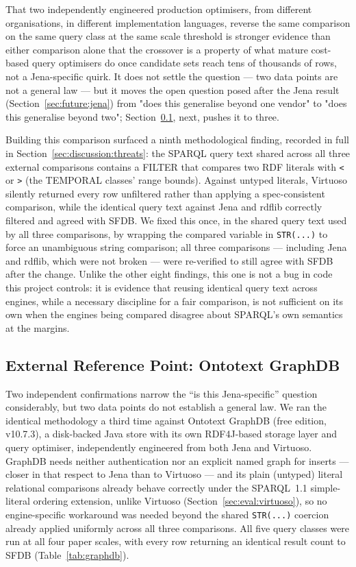 That two independently engineered production optimisers, from different
organisations, in different implementation languages, reverse the same
comparison on the same query class at the same scale threshold is
stronger evidence than either comparison alone that the crossover is a
property of what mature cost-based query optimisers do once candidate
sets reach tens of thousands of rows, not a Jena-specific quirk. It does
not settle the question --- two data points are not a general law --- but it moves the
open question posed after the Jena result (Section~\ref{sec:future:jena})
from "does this generalise beyond one vendor" to "does this generalise
beyond two"; Section~\ref{sec:eval:graphdb}, next, pushes it to three.

Building this comparison surfaced a ninth methodological finding,
recorded in full in Section~\ref{sec:discussion:threats}: the SPARQL
query text shared across all three external comparisons contains a
FILTER that compares two RDF literals with \texttt{<} or \texttt{>}
(the TEMPORAL classes' range bounds). Against untyped literals, Virtuoso
silently returned every row unfiltered rather than applying a
spec-consistent comparison, while the identical query text against Jena
and rdflib correctly filtered and agreed with SFDB. We fixed this once,
in the shared query text used by all three comparisons, by wrapping the
compared variable in \texttt{STR(...)} to force an unambiguous string
comparison; all three comparisons --- including Jena and rdflib, which
were not broken --- were re-verified to still agree with SFDB after the
change. Unlike the other eight findings, this one is not a bug in code
this project controls: it is evidence that reusing identical query text
across engines, while a necessary discipline for a fair comparison, is
not sufficient on its own when the engines being compared disagree about
SPARQL's own semantics at the margins.

\subsection{External Reference Point: Ontotext GraphDB}
\label{sec:eval:graphdb}

Two independent confirmations narrow the ``is this Jena-specific''
question considerably, but two data points do not establish a general
law. We ran the identical methodology a third time against Ontotext
GraphDB (free edition, v10.7.3), a disk-backed Java store with its own
RDF4J-based storage layer and query optimiser, independently engineered
from both Jena and Virtuoso. GraphDB needs neither authentication nor an
explicit named graph for inserts --- closer in that respect to Jena than
to Virtuoso --- and its plain (untyped) literal relational comparisons
already behave correctly under the SPARQL~1.1 simple-literal ordering
extension, unlike Virtuoso (Section~\ref{sec:eval:virtuoso}), so no
engine-specific workaround was needed beyond the shared
\texttt{STR(...)} coercion already applied uniformly across all three
comparisons. All five query classes were run at all four paper scales,
with every row returning an identical result count to SFDB
(Table~\ref{tab:graphdb}).

